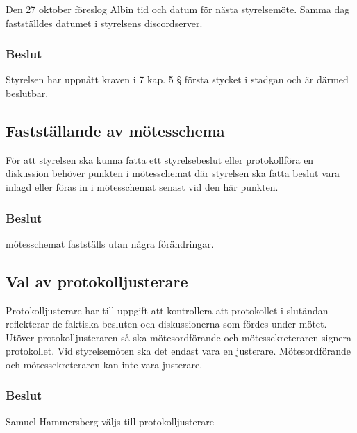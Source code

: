 \documentclass[protokoll]{dvd}
\begin{document}
Den 27 oktober föreslog Albin tid och datum för nästa styrelsemöte. Samma dag fastställdes datumet i styrelsens discordserver.

\subsubsection*{Beslut}

\begin{attsatser}
    \item Styrelsen har uppnått kraven i 7 kap. 5 § första stycket i stadgan och är därmed beslutbar.
\end{attsatser}






\subsection{Fastställande av mötesschema}

För att styrelsen ska kunna fatta ett styrelsebeslut eller protokollföra en diskussion behöver punkten i mötesschemat där styrelsen ska fatta beslut vara inlagd eller föras in i mötesschemat senast vid den här punkten.

\subsubsection*{Beslut}

\begin{attsatser}
    \item mötesschemat fastställs utan några förändringar.
\end{attsatser}






\subsection{Val av protokolljusterare}

Protokolljusterare har till uppgift att kontrollera att protokollet i slutändan reflekterar de faktiska besluten och diskussionerna som fördes under mötet.
Utöver protokolljusteraren så ska mötesordförande och mötessekreteraren signera protokollet.
Vid styrelsemöten ska det endast vara en justerare.
Mötesordförande och mötessekreteraren kan inte vara justerare.


\subsubsection*{Beslut}
\begin{attsatser}
    \item Samuel Hammersberg väljs till protokolljusterare
\end{attsatser}
\end{document}
